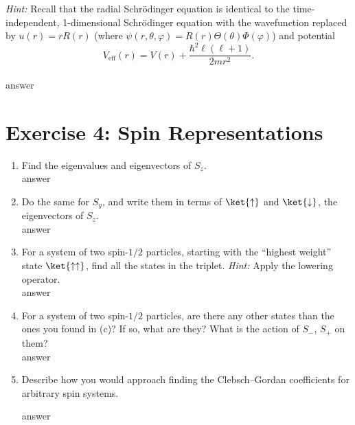 \documentclass[11pt]{article}
\begin{document}
\emph{Hint:} Recall that the radial Schrödinger equation is identical to the time-independent, 1-dimensional Schrödinger equation with the wavefunction replaced by $u(r) = rR(r)$ (where $\psi(r,\theta,\varphi) = R(r)\Theta(\theta)\Phi(\varphi)$) and potential
\[
V_{\text{eff}}(r) = V(r) + \frac{\hbar^2 \ell(\ell+1)}{2mr^2}.
\]\\

answer


\section*{Exercise 4: Spin Representations}
\begin{enumerate}[label=\alph*)]
\item Find the eigenvalues and eigenvectors of $S_z$.\\

answer

\item Do the same for $S_y$, and write them in terms of $\ket{\uparrow}$ and $\ket{\downarrow}$, the eigenvectors of $S_z$.\\

answer

\item For a system of two spin-$1/2$ particles, starting with the ``highest weight'' state $\ket{\uparrow \uparrow}$, find all the states in the triplet.  
\emph{Hint:} Apply the lowering operator.\\

answer

\item For a system of two spin-$1/2$ particles, are there any other states than the ones you found in (c)? If so, what are they? What is the action of $S_-$, $S_+$ on them?\\

answer

\item Describe how you would approach finding the Clebsch–Gordan coefficients for arbitrary spin systems.

answer

\end{enumerate}
\end{document}
